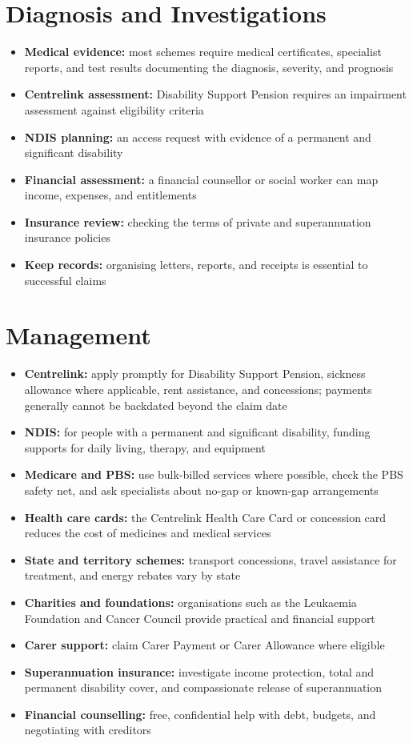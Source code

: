 \section*{Diagnosis and Investigations}
\begin{itemize}
    \item \textbf{Medical evidence:} most schemes require medical certificates, specialist reports, and test results documenting the diagnosis, severity, and prognosis
    \item \textbf{Centrelink assessment:} Disability Support Pension requires an impairment assessment against eligibility criteria
    \item \textbf{NDIS planning:} an access request with evidence of a permanent and significant disability
    \item \textbf{Financial assessment:} a financial counsellor or social worker can map income, expenses, and entitlements
    \item \textbf{Insurance review:} checking the terms of private and superannuation insurance policies
    \item \textbf{Keep records:} organising letters, reports, and receipts is essential to successful claims
\end{itemize}

\section*{Management}
\begin{itemize}
    \item \textbf{Centrelink:} apply promptly for Disability Support Pension, sickness allowance where applicable, rent assistance, and concessions; payments generally cannot be backdated beyond the claim date
    \item \textbf{NDIS:} for people with a permanent and significant disability, funding supports for daily living, therapy, and equipment
    \item \textbf{Medicare and PBS:} use bulk-billed services where possible, check the PBS safety net, and ask specialists about no-gap or known-gap arrangements
    \item \textbf{Health care cards:} the Centrelink Health Care Card or concession card reduces the cost of medicines and medical services
    \item \textbf{State and territory schemes:} transport concessions, travel assistance for treatment, and energy rebates vary by state
    \item \textbf{Charities and foundations:} organisations such as the Leukaemia Foundation and Cancer Council provide practical and financial support
    \item \textbf{Carer support:} claim Carer Payment or Carer Allowance where eligible
    \item \textbf{Superannuation insurance:} investigate income protection, total and permanent disability cover, and compassionate release of superannuation
    \item \textbf{Financial counselling:} free, confidential help with debt, budgets, and negotiating with creditors
\end{itemize}

